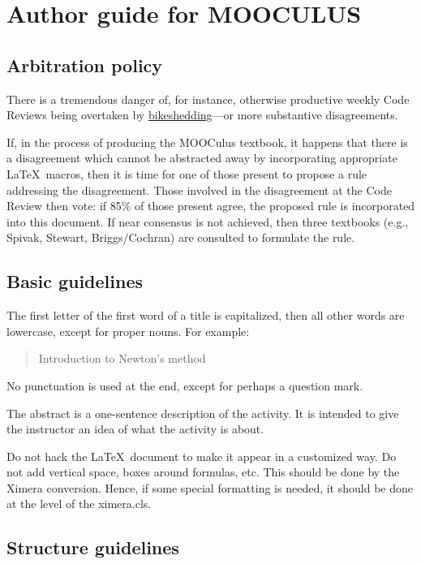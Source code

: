 \documentclass{article}
\newcommand{\mooculus}{\textsf{\textbf{MOOC}\textnormal{\textsf{ULUS}}}}
\begin{document}
\section*{Author guide for \mooculus}

\subsection*{Arbitration policy}

There is a tremendous danger of, for instance, otherwise productive weekly Code Reviews being overtaken by \href{http://en.wikipedia.org/wiki/Parkinson's_law_of_triviality}{bikeshedding}---or more substantive disagreements.

If, in the process of producing the MOOCulus textbook, it happens that
there is a disagreement which cannot be abstracted away by
incorporating appropriate \LaTeX\ macros, then it is time for one of
those present to propose a rule addressing the disagreement.  Those
involved in the disagreement at the Code Review then vote: if 85\% of
those present agree, the proposed rule is incorporated into this
document.  If near consensus is not achieved, then three textbooks
(e.g., Spivak, Stewart, Briggs/Cochran) are consulted to formulate the
rule.

\subsection*{Basic guidelines}

The first letter of the first word of a title is capitalized, then all
other words are lowercase, except for proper nouns. For example:
\begin{quote}
Introduction to Newton's method
\end{quote}
No punctuation is used at the end, except for perhaps a question mark.


The abstract is a one-sentence description of the activity. It is
intended to give the instructor an idea of what the activity is about.


Do not hack the \LaTeX\ document to make it appear in a customized
way. Do not add vertical space, boxes around formulas, etc. This
should be done by the Ximera conversion. Hence, if some special
formatting is needed, it should be done at the level of the
ximera.cls.

\subsection*{Structure guidelines}
\end{document}
